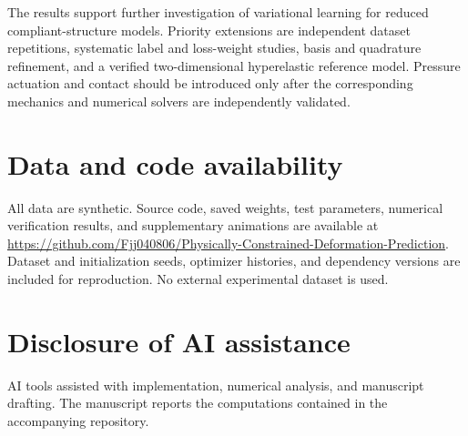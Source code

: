 \documentclass[11pt,a4paper]{article}
\begin{document}
The results support further investigation of variational learning for reduced compliant-structure models. Priority extensions are independent dataset repetitions, systematic label and loss-weight studies, basis and quadrature refinement, and a verified two-dimensional hyperelastic reference model. Pressure actuation and contact should be introduced only after the corresponding mechanics and numerical solvers are independently validated.

\section*{Data and code availability}
All data are synthetic. Source code, saved weights, test parameters, numerical verification results, and supplementary animations are available at \url{https://github.com/Fjj040806/Physically-Constrained-Deformation-Prediction}. Dataset and initialization seeds, optimizer histories, and dependency versions are included for reproduction. No external experimental dataset is used.

\section*{Disclosure of AI assistance}
AI tools assisted with implementation, numerical analysis, and manuscript drafting. The manuscript reports the computations contained in the accompanying repository.
\end{document}
